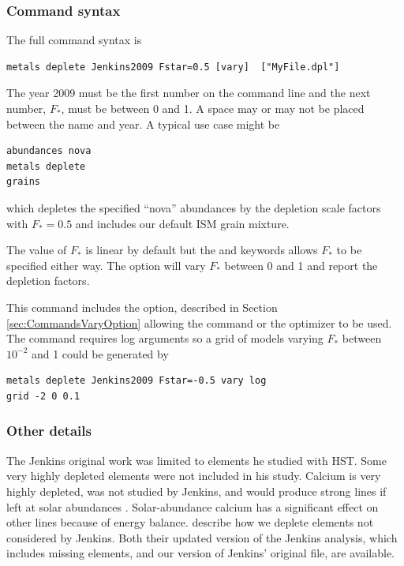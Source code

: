 \subsubsection{Command syntax}

The full command syntax is
\begin{verbatim}
metals deplete Jenkins2009 Fstar=0.5 [vary]  ["MyFile.dpl"]
\end{verbatim}
The year 2009 must be the first number on the command line and the next number, $F_*$,
must be between 0 and 1.
A space may or may not be placed between the name and year.
A typical use case might be
\begin{verbatim}
abundances nova
metals deplete
grains
\end{verbatim}
which depletes the specified ``nova'' abundances by the \citet{2009ApJ...700.1299J}
depletion scale factors with $F_* = 0.5$ and includes our default ISM grain mixture.

The value of $F_*$ is linear by default but
the  and  keywords allows
$F_*$ to be specified either way.
 The  option will vary $F_*$ between 0 and 1 and report the depletion factors.

This command includes the  option, described in Section \ref{sec:CommandsVaryOption}
allowing the  command
 or the  optimizer to be used.
 The   command requires log arguments so a grid of models
 varying $F_*$ between $10^{-2}$ and 1 could be generated by
 \begin{verbatim}
metals deplete Jenkins2009 Fstar=-0.5 vary log
grid -2 0 0.1 
\end{verbatim}
 

\subsubsection{Other details}

 The Jenkins original work was limited to elements he studied with HST.  
 Some very highly depleted elements were not included in his study.
 Calcium is very highly depleted, was not studied by Jenkins, and would 
 produce strong lines if left at solar abundances
 \citep{KingdonFerlandFeibelman1995} .  Solar-abundance calcium has a significant
effect on other lines because of energy balance.
 describe how we deplete elements not considered by Jenkins.
Both their updated version of the Jenkins analysis, which includes  missing elements, and our
version of Jenkins' original file, are available. 

